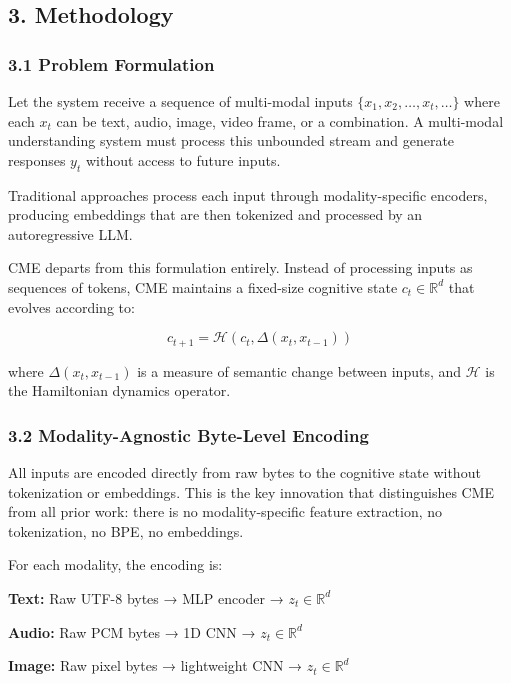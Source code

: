 \documentclass[
  11pt,
  a4paper,
]{article}
\begin{document}
\subsection{3. Methodology}\label{methodology}

\subsubsection{3.1 Problem Formulation}\label{problem-formulation}

Let the system receive a sequence of multi-modal inputs
\(\{x_1, x_2, \dots, x_t, \dots\}\) where each \(x_t\) can be text,
audio, image, video frame, or a combination. A multi-modal understanding
system must process this unbounded stream and generate responses \(y_t\)
without access to future inputs.

Traditional approaches process each input through modality-specific
encoders, producing embeddings that are then tokenized and processed by
an autoregressive LLM.

CME departs from this formulation entirely. Instead of processing inputs
as sequences of tokens, CME maintains a fixed-size cognitive state
\(c_t \in \mathbb{R}^{d}\) that evolves according to:

\[
c_{t+1} = \mathcal{H}\left(c_t, \Delta(x_t, x_{t-1})\right)
\]

where \(\Delta(x_t, x_{t-1})\) is a measure of semantic change between
inputs, and \(\mathcal{H}\) is the Hamiltonian dynamics operator.

\subsubsection{3.2 Modality-Agnostic Byte-Level
Encoding}\label{modality-agnostic-byte-level-encoding}

All inputs are encoded directly from raw bytes to the cognitive state
without tokenization or embeddings. This is the key innovation that
distinguishes CME from all prior work: there is no modality-specific
feature extraction, no tokenization, no BPE, no embeddings.

For each modality, the encoding is:

\textbf{Text:} Raw UTF-8 bytes → MLP encoder →
\(z_t \in \mathbb{R}^{d}\)

\textbf{Audio:} Raw PCM bytes → 1D CNN → \(z_t \in \mathbb{R}^{d}\)

\textbf{Image:} Raw pixel bytes → lightweight CNN →
\(z_t \in \mathbb{R}^{d}\)
\end{document}

